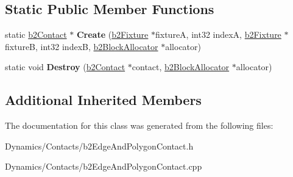 \subsection*{Static Public Member Functions}
\begin{DoxyCompactItemize}
\item 
\mbox{\label{classb2EdgeAndPolygonContact_a3a0bcb2327e02bfc2079a734d8e9c8f7}} 
static \mbox{\hyperlink{classb2Contact}{b2\+Contact}} $\ast$ {\bfseries Create} (\mbox{\hyperlink{classb2Fixture}{b2\+Fixture}} $\ast$fixtureA, int32 indexA, \mbox{\hyperlink{classb2Fixture}{b2\+Fixture}} $\ast$fixtureB, int32 indexB, \mbox{\hyperlink{classb2BlockAllocator}{b2\+Block\+Allocator}} $\ast$allocator)
\item 
\mbox{\label{classb2EdgeAndPolygonContact_a83260c190706928518ab1a3040c0c515}} 
static void {\bfseries Destroy} (\mbox{\hyperlink{classb2Contact}{b2\+Contact}} $\ast$contact, \mbox{\hyperlink{classb2BlockAllocator}{b2\+Block\+Allocator}} $\ast$allocator)
\end{DoxyCompactItemize}
\subsection*{Additional Inherited Members}


The documentation for this class was generated from the following files\+:\begin{DoxyCompactItemize}
\item 
Dynamics/\+Contacts/b2\+Edge\+And\+Polygon\+Contact.\+h\item 
Dynamics/\+Contacts/b2\+Edge\+And\+Polygon\+Contact.\+cpp\end{DoxyCompactItemize}
